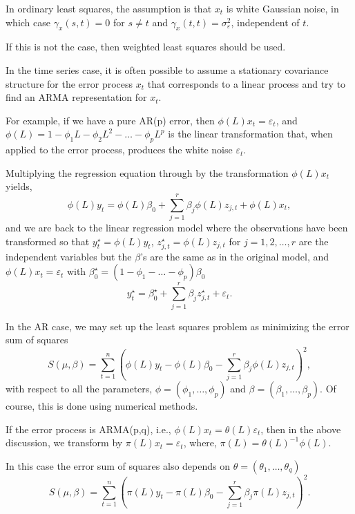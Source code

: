 \documentclass[
paper=128mm:96mm, %
fontsize=9.5pt, %
pagesize, %
parskip=half-, %
]{scrartcl} %
\theoremstyle{mythmstyle} %
\begin{document}
In ordinary least squares, the assumption is that $x_t$ is white Gaussian noise, in which case $\gamma_x(s,t)=0$ for $s\neq t$ and $\gamma_x(t,t)=\sigma_\varepsilon^2$, independent of $t$. 

If this is not the case, then weighted least squares should be used.

In the time series case, it is often possible to assume a stationary covariance structure for the error process $x_t$ that corresponds to a linear process and try to find an ARMA representation for $x_t$. 
\clearpage

For example, if we have a pure AR(p) error, then $\phi(L)x_t=\varepsilon_t$, and $\phi(L)=1-\phi_1L-\phi_2L^2-\dots-\phi_pL^p$ is the linear transformation that, when applied to the error process, produces the white noise $\varepsilon_t$. 

Multiplying the regression equation through by the transformation $\phi(L)x_t$ yields,
%
\begin{equation}
\phi(L)y_t=\phi(L)\beta_0+\sum_{j=1}^r\beta_j\phi(L)z_{j,t}+\phi(L)x_t,
\end{equation}
%
and we are back to the linear regression model where the observations have been transformed so that $y_t^\star=\phi(L)y_t$, $z_{j,t}^\star=\phi(L)z_{j,t}$ for $j=1,2,\dots,r$ are the independent variables but the $\beta$'s are the same as in the original model, and $\phi(L)x_t=\varepsilon_t$ with
$\beta^\star_0=\left(1-\phi_1-\dots-\phi_p\right)\beta_0$
%
\begin{equation}
y^\star_t=\beta^\star_0+\sum_{j=1}^r\beta_jz^\star_{j,t}+\varepsilon_t.
\end{equation}
%
\clearpage



In the AR case, we may set up the least squares problem as minimizing the
error sum of squares
%
\begin{equation}
S\left(\mu,\beta\right)=\sum_{t=1}^n\left(\phi(L)y_t-\phi(L)\beta_0-\sum_{j=1}^r\beta_j\phi(L)z_{j,t}\right)^2,\nonumber
\end{equation}
%
with respect to all the parameters, $\phi=\left(\phi_1,\dots,\phi_p\right)$ and $\beta=\left(\beta_1,\dots,\beta_p\right)$. Of course, this is done using numerical methods.

If the error process is ARMA(p,q), i.e., $\phi(L)x_t=\theta(L)\varepsilon_t$, then in the above discussion, we transform by $\pi(L)x_t=\varepsilon_t$, where, $\pi(L)=\theta(L)^{-1}\phi(L)$. 

In this case the error sum of squares also depends on $\theta=\left(\theta_1,\dots,\theta_q\right)$
%
\begin{equation}
S\left(\mu,\beta\right)=\sum_{t=1}^n\left(\pi(L)y_t-\pi(L)\beta_0-\sum_{j=1}^r\beta_j\pi(L)z_{j,t}\right)^2.\nonumber
\end{equation}
%
\clearpage
\end{document}
